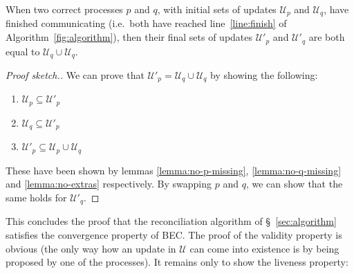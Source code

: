 \documentclass[a4paper,anonymous,USenglish]{lipics-v2019}
\begin{document}
\begin{theorem}\label{theorem:convergence}
When two correct processes $p$ and $q$, with initial sets of updates $\mathcal{U}_p$ and $\mathcal{U}_q$, have finished communicating (i.e.\ both have reached line~\ref{line:finish} of Algorithm~\ref{fig:algorithm}), then their final sets of updates $\mathcal{U}'_p$ and $\mathcal{U}'_q$  are both equal to $\mathcal{U}_q \cup \mathcal{U}_q$.
\end{theorem}
\begin{proof}[Proof sketch.]
We can prove that $\mathcal{U}'_p = \mathcal{U}_q \cup \mathcal{U}_q$ by showing the following:
\begin{enumerate}
   \item $\mathcal{U}_p \subseteq \mathcal{U}'_p$
   \item $\mathcal{U}_q \subseteq \mathcal{U}'_p$
   \item $\mathcal{U}'_p \subseteq \mathcal{U}_p \cup \mathcal{U}_q$
\end{enumerate}

These have been shown by lemmas \ref{lemma:no-p-missing}, \ref{lemma:no-q-missing} and \ref{lemma:no-extras} respectively.  
By swapping $p$ and $q$, we can show that the same holds for $\mathcal{U}'_q$.
\end{proof}

This concludes the proof that the reconciliation algorithm of \S~\ref{sec:algorithm} satisfies the convergence property of BEC.
The proof of the validity property is obvious (the only way how an update in $\mathcal{U}$ can come into existence is by being proposed by one of the processes).
It remains only to show the liveness property:
\end{document}
